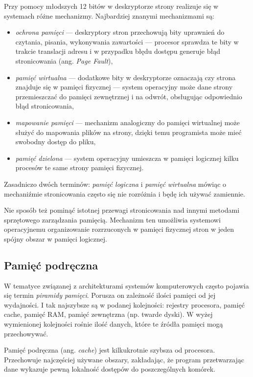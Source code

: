 \documentclass[12pt,a4paper,titlepage,twoside]{mwart}
\begin{document}
Przy pomocy młodszych 12 bitów w deskryptorze strony realizuje się w systemach
różne mechanizmy. Najbardziej znanymi mechanizmami są:
\begin{itemize}
\item \textit{ochrona pamięci} --- deskryptory stron przechowują bity uprawnień do
czytania, pisania, wykonywania zawartości --- procesor sprawdza te bity w
trakcie translacji adresu i w przypadku błędu dostępu generuje błąd
stronicowania (ang. \textit{Page Fault}),
\item \textit{pamięć wirtualna} --- dodatkowe bity w deskryptorze oznaczają czy
strona znajduje się w pamięci fizycznej --- system operacyjny może dane strony
przemieszczać do pamięci zewnętrznej i na odwrót, obsługując odpowiednio błąd
stronicowania,
\item \textit{mapowanie pamięci} --- mechanizm analogiczny do pamięci wirtualnej
może służyć do mapowania plików na strony, dzięki temu programista może mieć
swobodny dostęp do pliku,
\item \textit{pamięć dzielona} --- system operacyjny umieszcza w pamięci logicznej kilku
procesów te same strony pamięci fizycznej.
\end{itemize}

Zasadniczo dwóch terminów: \textit{pamięć logiczna} i \textit{pamięć wirtualna}
mówiąc o mechaniźmie stronicowania często się nie rozróżnia i będę ich używać
zamiennie.

Nie sposób też pominąć istotnej przewagi stronicowania nad innymi metodami
sprzętowego zarządzania pamięcią. Mechanizm ten umożliwia systemowi
operacyjnemu organizowanie rozrzuconych w pamięci fizycznej stron w jeden
spójny obszar w pamięci logicznej.

\subsection{Pamięć podręczna}
\label{CacheMemory}

W tematyce związanej z architekturami systemów komputerowych często pojawia się
termin \textit{piramidy pamięci}. Porusza on zależność ilości pamięci od jej
wydajności. I tak najszybsze są w podanej kolejności: rejestry procesora,
pamięć cache, pamięć RAM, pamięć zewnętrzna (np. twarde dyski). W wyżej
wymienionej kolejności rośnie ilość danych, które te źródła pamięci mogą
przechowywać.

Pamięć podręczna (ang. \textit{cache}) jest kilkukrotnie szybsza od procesora.
Przechowuje najczęściej używane obszary, zakładając, że program przetwarzając
dane wykazuje pewną lokalność dostępów do poszczególnych komórek.
\end{document}
